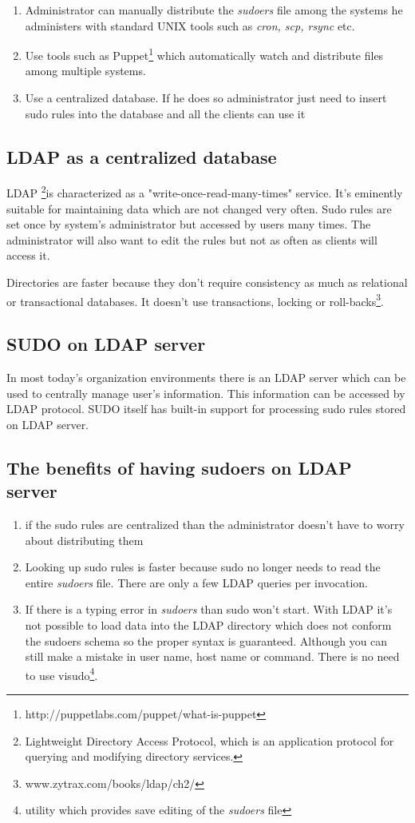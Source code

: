 \documentclass[12pt,a4paper,titlepage,final]{article}
\begin{document}
\begin{enumerate} 
	\item Administrator can manually distribute the \emph{sudoers} file among the
		systems he administers with standard UNIX tools such as \emph{cron, scp,
		rsync} etc.
	\item Use tools such as
		Puppet\footnote{http://puppetlabs.com/puppet/what-is-puppet} which
		automatically watch and distribute files among multiple systems.
	\item Use a centralized database. If he does so administrator just need to
		insert sudo rules into the database and all the clients can use it
\end{enumerate}

\subsection{LDAP as a centralized database}
LDAP \footnote{Lightweight Directory Access Protocol, which is an application
protocol for querying and modifying directory services.}is characterized as a
"write-once-read-many-times" service. It's eminently suitable for maintaining
data which are not changed very often. Sudo rules are set once by system's
administrator but accessed by users many times. The administrator will also want
to edit the rules but not as often as clients will access it.

Directories are faster because they don't require consistency as
much as relational or transactional databases. It doesn't use transactions,
locking or roll-backs\footnote{www.zytrax.com/books/ldap/ch2/}.


\subsection{SUDO on LDAP server}
In most today's organization environments there is an LDAP server which can be
used to centrally manage user's information. This information can be accessed
by LDAP protocol. SUDO itself has built-in support for processing sudo rules
stored on LDAP server.


\subsection{The benefits of having sudoers on LDAP server}
\begin{enumerate} 
	\item if the sudo rules are centralized than the administrator doesn't have to
		worry about distributing them
	\item Looking up sudo rules is faster because sudo no longer needs to read
		the entire \emph{sudoers} file. There are only a few LDAP queries per
		invocation.
	\item If there is a typing error in \emph{sudoers} than sudo won't start. With
		LDAP it's not possible to load data into the LDAP directory which does not
		conform the sudoers schema so the proper syntax is guaranteed. Although you
		can still make a mistake in user name, host name or command. There is no
		need to use visudo\footnote{utility which provides save editing of the
		\emph{sudoers} file}.
\end{enumerate}
\end{document}
